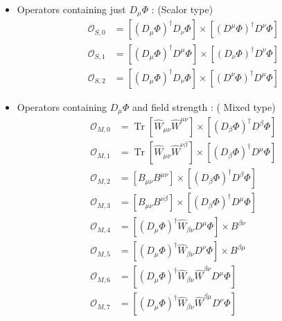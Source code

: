 \begin{itemize}
\item Operators containing just $D_\mu \Phi$ : (Scalor type)
\begin{equation}
\begin{aligned}
\mathcal{O}_{S, 0} &=\left[\left(D_{\mu} \Phi\right)^{\dagger} D_{\nu} \Phi\right] \times\left[\left(D^{\mu} \Phi\right)^{\dagger} D^{\nu} \Phi\right] \\
\mathcal{O}_{S, 1} &=\left[\left(D_{\mu} \Phi\right)^{\dagger} D^{\mu} \Phi\right] \times\left[\left(D_{\nu} \Phi\right)^{\dagger} D^{\nu} \Phi\right] \\
\mathcal{O}_{S, 2} &=\left[\left(D_{\mu} \Phi\right)^{\dagger} D_{\nu} \Phi\right] \times\left[\left(D^{\nu} \Phi\right)^{\dagger} D^{\mu} \Phi\right]
\end{aligned}
\end{equation}
\item Operators containing $D_\mu \Phi$ and field strength : ( Mixed type)
\begin{equation}
\begin{aligned}
\mathcal{O}_{M, 0} &=\operatorname{Tr}\left[\hat{W}_{\mu \nu} \hat{W}^{\mu \nu}\right] \times\left[\left(D_{\beta} \Phi\right)^{\dagger} D^{\beta} \Phi\right] \\
\mathcal{O}_{M, 1} &=\operatorname{Tr}\left[\hat{W}_{\mu \nu} \hat{W}^{\nu \beta}\right] \times\left[\left(D_{\beta} \Phi\right)^{\dagger} D^{\mu} \Phi\right] \\
\mathcal{O}_{M, 2} &=\left[B_{\mu \nu} B^{\mu \nu}\right] \times\left[\left(D_{\beta} \Phi\right)^{\dagger} D^{\beta} \Phi\right] \\
\mathcal{O}_{M, 3} &=\left[B_{\mu \nu} B^{\nu \beta}\right] \times\left[\left(D_{\beta} \Phi\right)^{\dagger} D^{\mu} \Phi\right] \\
\mathcal{O}_{M, 4} &=\left[\left(D_{\mu} \Phi\right)^{\dagger} \hat{W}_{\beta \nu} D^{\mu} \Phi\right] \times B^{\beta \nu} \\
\mathcal{O}_{M, 5} &=\left[\left(D_{\mu} \Phi\right)^{\dagger} \hat{W}_{\beta \nu} D^{\nu} \Phi\right] \times B^{\beta \mu} \\
\mathcal{O}_{M, 6} &=\left[\left(D_{\mu} \Phi\right)^{\dagger} \hat{W}_{\beta \nu} \hat{W}^{\beta \nu} D^{\mu} \Phi\right] \\
\mathcal{O}_{M, 7} &=\left[\left(D_{\mu} \Phi\right)^{\dagger} \hat{W}_{\beta \nu} \hat{W}^{\beta \mu} D^{\nu} \Phi\right]
\end{aligned}
\end{equation}

\end{itemize}
